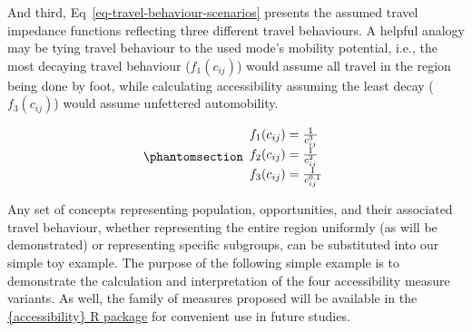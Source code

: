 \documentclass[
  10pt,
  letterpaper,
]{article}
\begin{document}
\begin{table}

\caption{\label{tbl-small-system-cost}Cost matrix for system with three
zones (travel time in minutes).}


\end{table}%

And third, Eq~\ref{eq-travel-behaviour-scenarios} presents the assumed
travel impedance functions reflecting three different travel behaviours.
A helpful analogy may be tying travel behaviour to the used mode's
mobility potential, i.e., the most decaying travel behaviour
(\(f_1(c_{ij})\)) would assume all travel in the region being done by
foot, while calculating accessibility assuming the least decay
(\(f_3(c_{ij})\)) would assume unfettered automobility.

\begin{equation}\phantomsection\label{eq-travel-behaviour-scenarios}{
\begin{array}{l}
f_1(c_{ij}) = \frac{1}{c_{ij}^3}\\
f_2(c_{ij}) = \frac{1}{c_{ij}^2}\\
f_3(c_{ij}) = \frac{1}{c_{ij}^{0.1}}
\end{array}
}\end{equation}

Any set of concepts representing population, opportunities, and their
associated travel behaviour, whether representing the entire region
uniformly (as will be demonstrated) or representing specific subgroups,
can be substituted into our simple toy example. The purpose of the
following simple example is to demonstrate the calculation and
interpretation of the four accessibility measure variants. As well, the
family of measures proposed will be available in the
\href{https://ipeagit.github.io/accessibility/}{\{accessibility\} R
package} for convenient use in future studies.
\end{document}
